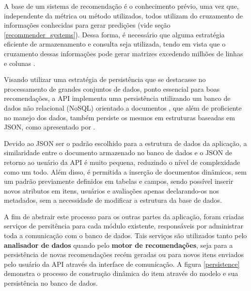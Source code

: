 A base de um sistema de recomendação é o conhecimento prévio, uma vez que, independente da métrica ou método utilizados, todos utilizam do cruzamento de informações conhecidas para gerar predições (vide seção \ref{recommender_systems}). Dessa forma, é necessário que alguma estratégia eficiente de armazenamento e consulta seja utilizada, tendo em vista que o cruzamento dessas informações pode gerar matrizes excedendo milhões de linhas e colunas \cite{gomez2016netflix}.

Visando utilizar uma estratégia de persistência que se destacasse no processamento de grandes conjuntos de dados, ponto essencial para boas recomendações, a API implementa uma persistência utilizando um banco de dados não relacional (NoSQL) orientado a documentos \cite{leavitt2010will}, que além de proficiente no manejo dos dados, também persiste os mesmos em estruturas baseadas em JSON, como apresentado por .

Devido ao JSON ser o padrão escolhido para a estrutura de dados da aplicação, a similaridade entre o documento armazenado no banco de dados e o JSON de retorno ao usuário da API é muito pequena, reduzindo o nível de complexidade como um todo. Além disso, é permitida a inserção de documentos dinâmicos, sem um padrão previamente definidos em tabelas e campos, sendo possível inserir novos atributos em itens, usuários e avaliações apenas declarando-os nos metadados, sem a necessidade de modificar a estrutura da base de dados.

A fim de abstrair este processo para os outras partes da aplicação, foram criadas serviços de persitência para cada módulo existente, responsáveis por administrar toda a comunicação com o banco de dados. Tais serviços são utilizados tanto pelo \textbf{analisador de dados} quando pelo \textbf{motor de recomendações}, seja para a persistência de novas recomendações recém geradas ou para novos itens enviados pelo usuário da API através da interface de comunicação. A figura \ref{persistence} demonstra o processo de construção dinâmica do item através do modelo e sua persistência no banco de dados.

